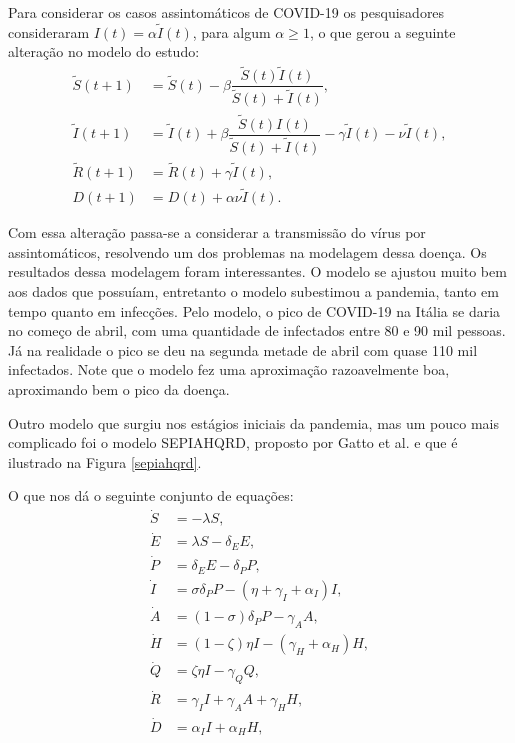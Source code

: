 \documentclass{article}
\begin{document}
Para considerar os casos assintomáticos de COVID-19 os pesquisadores consideraram $I(t) = \alpha\tilde{I}(t)$, para algum $\alpha \geq 1$, o que gerou a seguinte alteração no modelo do estudo:
\begin{equation*}
    \begin{split}
        \tilde{S}(t + 1) & = \tilde{S}(t) - \beta \dfrac{\tilde{S}(t) \tilde{I}(t)}{\tilde{S}(t) + \tilde{I}(t)}, \\
        \tilde{I}(t + 1) & = \tilde{I}(t) + \beta \dfrac{\tilde{S}(t) I(t)}{\tilde{S}(t) + \tilde{I}(t)} - \gamma \tilde{I}(t) - \nu \tilde{I}(t), \\
        \tilde{R}(t + 1) & = \tilde{R}(t) + \gamma \tilde{I}(t), \\
        D(t + 1) & = D(t) + \alpha \nu \tilde{I}(t).
    \end{split}
\end{equation*}

Com essa alteração passa-se a considerar a transmissão do vírus por assintomáticos, resolvendo um dos problemas na modelagem dessa doença. Os resultados dessa modelagem foram interessantes. O modelo se ajustou muito bem aos dados que possuíam, entretanto o modelo subestimou a pandemia, tanto em tempo quanto em infecções. Pelo modelo, o pico de COVID-19 na Itália se daria no começo de abril, com uma quantidade de infectados entre 80 e 90 mil pessoas. Já na realidade o pico se deu na segunda metade de abril com quase 110 mil infectados. Note que o modelo fez uma aproximação razoavelmente boa, aproximando bem o pico da doença.

Outro modelo que surgiu nos estágios iniciais da pandemia, mas um pouco mais complicado foi o modelo SEPIAHQRD, proposto por Gatto et al. \cite{Gatto10484} e que é ilustrado na Figura \ref{sepiahqrd}.

O que nos dá o seguinte conjunto de equações:
\begin{equation*}
    \begin{split}
        \dot{S} & = -\lambda S,\\
        \dot{E} & = \lambda S - \delta_E E, \\
        \dot{P} & = \delta_E E - \delta_P P, \\
        \dot{I} & = \sigma \delta_P P - (\eta + \gamma_I + \alpha_I) I, \\
        \dot{A} & = (1-\sigma) \delta_P P - \gamma_A A, \\
        \dot{H} & = (1-\zeta) \eta I - (\gamma_H + \alpha_H) H, \\
        \dot{Q} & = \zeta \eta I - \gamma_Q Q, \\
        \dot{R} & = \gamma_I I + \gamma_A A + \gamma_H H, \\
        \dot{D} & = \alpha_I I + \alpha_H H,
    \end{split}
\end{equation*}
\end{document}
